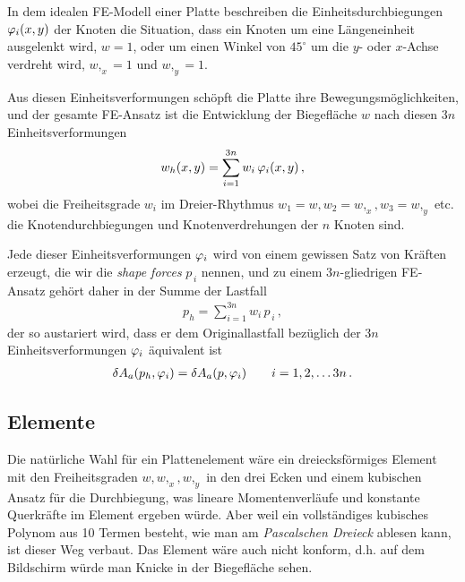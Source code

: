 In dem idealen FE-Modell einer Platte beschreiben die Einheitsdurchbiegungen $\varphi_i(x,y)$ der Knoten die Situation, dass ein Knoten um eine L\"{a}ngeneinheit ausgelenkt wird, $w = 1$, oder um einen Winkel von $45^\circ$ um die $y$- oder $x$-Achse verdreht wird, $w,_x = 1$ und $w,_y = 1$.

Aus diesen Einheitsverformungen sch\"{o}pft die Platte ihre Bewegungsm\"{o}g\-lich\-keiten, und der gesamte FE-Ansatz ist die Entwicklung der Biegefl\"{a}che $w$ nach diesen $3n$ Einheitsverformungen
\begin{align}
w_{h}(x,y) = \sum_{i = 1}^{3n} w_i \, \varphi_i(x,y)\,,
\end{align}
wobei die Freiheitsgrade $w_i$ im Dreier-Rhythmus $w_1 = w, w_2 = w,_x, w_3 = w,_y$ etc. die Knotendurchbiegungen und Knotenverdrehungen der $n$ Knoten sind.

Jede dieser Einheitsverformungen $\varphi_i$ wird von einem gewissen Satz von Kr\"{a}ften erzeugt, die wir die {\em shape forces\/} $p_{\,i}$ nennen, und zu einem $3n$-gliedrigen FE-Ansatz geh\"{o}rt daher in der Summe der Lastfall
\begin{align}
p_{h} = \sum_{i = 1}^{3n} w_i \, p_{\,i} \,,
\end{align}
der so austariert wird, dass er dem Originallastfall bez\"{u}glich der $3n$ Einheitsverformungen $\varphi_i$ \"{a}quivalent ist
\begin{align} \label{ArbeitE}
\delta A_a(p_{h},\varphi_i) = \delta A_a(p,\varphi_i) \qquad i = 1,2,\ldots 3n\,.
\end{align}

{\textcolor{sectionTitleBlue}{\section{Elemente}}}
Die nat\"{u}rliche Wahl f\"{u}r ein Plattenelement w\"{a}re ein dreiecksf\"{o}rmiges Element mit den Freiheitsgraden $w,w,_x,w,_y$ in den drei Ecken und einem kubischen Ansatz f\"{u}r die Durchbiegung, was lineare Momentenverl\"{a}ufe und konstante Querkr\"{a}fte im Element ergeben w\"{u}rde. Aber weil ein vollst\"{a}ndiges kubisches Polynom aus 10 Termen besteht, wie man am {\em Pascalschen Dreieck\/} ablesen kann, ist dieser Weg verbaut. Das Element w\"{a}re auch nicht konform, d.h. auf dem Bildschirm w\"{u}rde man Knicke in der Biegefl\"{a}che sehen.

